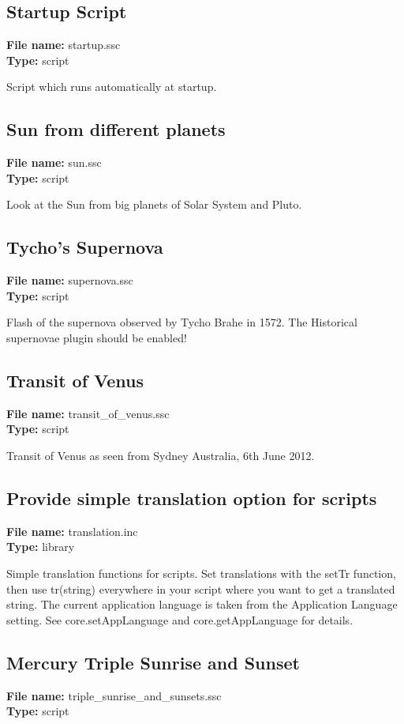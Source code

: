\subsection{Startup Script}
\textbf{File name:} startup.ssc \\
\textbf{Type:} script

Script which runs automatically at startup.

\subsection{Sun from different planets}
\textbf{File name:} sun.ssc \\
\textbf{Type:} script

Look at the Sun from big planets of Solar System and Pluto.

\subsection{Tycho's Supernova}
\textbf{File name:} supernova.ssc \\
\textbf{Type:} script

Flash of the supernova observed by Tycho Brahe in 1572. The Historical supernovae plugin should be enabled!

\subsection{Transit of Venus}
\textbf{File name:} transit\_of\_venus.ssc \\
\textbf{Type:} script

Transit of Venus as seen from Sydney Australia, 6th June 2012.

\subsection{Provide simple translation option for scripts}
\textbf{File name:} translation.inc \\
\textbf{Type:} library

Simple translation functions for scripts. Set translations with the setTr function, then use tr(string) everywhere in your script where you want to get a translated string.  The current application language is taken from the Application Language setting. See core.setAppLanguage and core.getAppLanguage for details.

\subsection{Mercury Triple Sunrise and Sunset}
\textbf{File name:} triple\_sunrise\_and\_sunsets.ssc \\
\textbf{Type:} script

